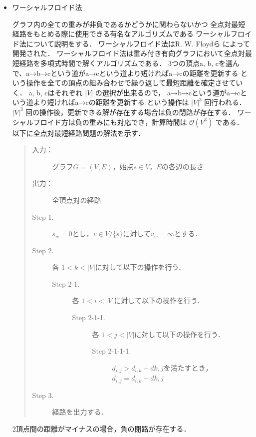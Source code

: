 \documentclass[12pt]{optlab-bachelor}
\begin{document}
\begin{itemize}
  \item ワーシャルフロイド法

  グラフ内の全ての重みが非負であるかどうかに関わらないかつ
  全点対最短経路をもとめる際に使用できる有名なアルゴリズムである
  ワーシャルフロイド法について説明をする．
  ワーシャルフロイド法はR. W. Floydら \cite{Floyd}によって開発された．
  ワーシャルフロイド法は重み付き有向グラフにおいて全点対最短経路を多項式時間で解くアルゴリズムである．
  3つの頂点a, b, cを選んで、a→b→cという道がa→cという道より短ければa→cの距離を更新する
  という操作を全ての頂点の組み合わせで繰り返して最短距離を確定させていく．
  a, b, cはそれぞれ $|V|$ の選択が出来るので，
  a→b→cという道がa→cという道より短ければa→cの距離を更新する
  という操作は $|V|^3$ 回行われる．
  $|V|^3$ 回の操作後，更新できる解が存在する場合は負の閉路が存在する．
  ワーシャルフロイド方は負の重みにも対応でき，計算時間は $\mathcal{\mathcal{O}}(V^3)$ である．
  以下に全点対最短経路問題の解法を示す．

  \begin{quote}
    \begin{description}
      \item[入力：] グラフ$G=(V,E)$，始点$s \in V$，$E$の各辺の長さ
      \item[出力：] 全頂点対の経路
      \item[Step 1.] $s_w = 0$とし，$v \in V/\{s\}$に対して$v_w = \infty$とする．
      \item[Step 2.] 各 $1<k<|V|$に対して以下の操作を行う．
      \begin{description}
        \item[Step 2-1.] 各 $1<i<|V|$に対して以下の操作を行う．
        \begin{description}
          \item[Step 2-1-1.] 各 $1<j<|V|$に対して以下の操作を行う．
          \begin{description}
            \item[Step 2-1-1-1.] $d_{i,j} > d_{i,k} + d{k,j}$を満たすとき，
            $d_{i,j} = d_{i,k} + d{k,j}$
          \end{description}
        \end{description}
      \end{description}

      \item[Step 3.] 経路を出力する．
    \end{description}
  \end{quote}
  2頂点間の距離がマイナスの場合，負の閉路が存在する．
\end{itemize}
\end{document}
